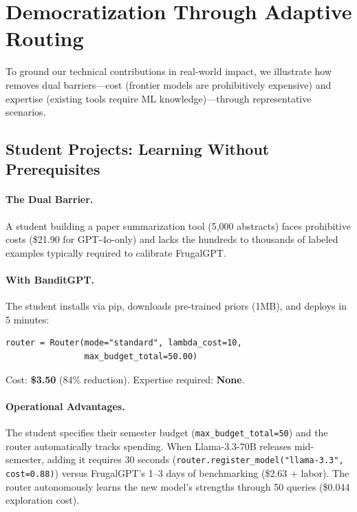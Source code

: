 
\section{Democratization Through Adaptive Routing}
\label{sec:use_cases}

To ground our technical contributions in real-world impact, we illustrate how \ours{} removes dual barriers---cost (frontier models are prohibitively expensive) and expertise (existing tools require ML knowledge)---through representative scenarios.

\subsection{Student Projects: Learning Without Prerequisites}

\paragraph{The Dual Barrier.} A student building a paper summarization tool (5,000 abstracts) faces prohibitive costs (\$21.90 for GPT-4o-only) and lacks the hundreds to thousands of labeled examples typically required to calibrate FrugalGPT.

\paragraph{With BanditGPT.} The student installs via pip, downloads pre-trained priors (1MB), and deploys in 5 minutes:

\begin{small}
\begin{verbatim}
router = Router(mode="standard", lambda_cost=10,
                max_budget_total=50.00)
\end{verbatim}
\end{small}

\noindent Cost: \textbf{\$3.50} (84\% reduction). Expertise required: \textbf{None}.

\paragraph{Operational Advantages.} The student specifies their semester budget (\texttt{max\_budget\_total=50}) and the router automatically tracks spending. When Llama-3.3-70B releases mid-semester, adding it requires 30 seconds (\texttt{router.register\_model("llama-3.3", cost=0.88)}) versus FrugalGPT's 1--3 days of benchmarking (\$2.63 + labor). The router autonomously learns the new model's strengths through 50 queries (\$0.044 exploration cost).

